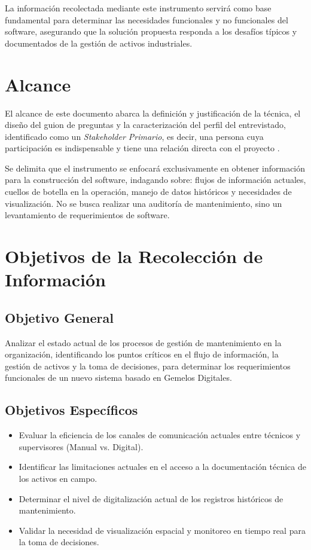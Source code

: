 \documentclass[12pt, a4paper]{article}
\begin{document}
La información recolectada mediante este instrumento servirá como base fundamental para determinar las necesidades funcionales y no funcionales del software, asegurando que la solución propuesta responda a los desafíos típicos y documentados de la gestión de activos industriales.

\section{Alcance}

El alcance de este documento abarca la definición y justificación de la técnica, el diseño del guion de preguntas y la caracterización del perfil del entrevistado, identificado como un \textit{Stakeholder Primario}, es decir, una persona cuya participación es indispensable y tiene una relación directa con el proyecto \parencite{sena:fundamentos2024}.

Se delimita que el instrumento se enfocará exclusivamente en obtener información para la construcción del software, indagando sobre: flujos de información actuales, cuellos de botella en la operación, manejo de datos históricos y necesidades de visualización. No se busca realizar una auditoría de mantenimiento, sino un levantamiento de requerimientos de software.

\section{Objetivos de la Recolección de Información}

\subsection{Objetivo General}
Analizar el estado actual de los procesos de gestión de mantenimiento en la organización, identificando los puntos críticos en el flujo de información, la gestión de activos y la toma de decisiones, para determinar los requerimientos funcionales de un nuevo sistema basado en Gemelos Digitales.

\subsection{Objetivos Específicos}
\begin{itemize}
    \item Evaluar la eficiencia de los canales de comunicación actuales entre técnicos y supervisores (Manual vs. Digital).
    \item Identificar las limitaciones actuales en el acceso a la documentación técnica de los activos en campo.
    \item Determinar el nivel de digitalización actual de los registros históricos de mantenimiento.
    \item Validar la necesidad de visualización espacial y monitoreo en tiempo real para la toma de decisiones.
\end{itemize}
\end{document}
